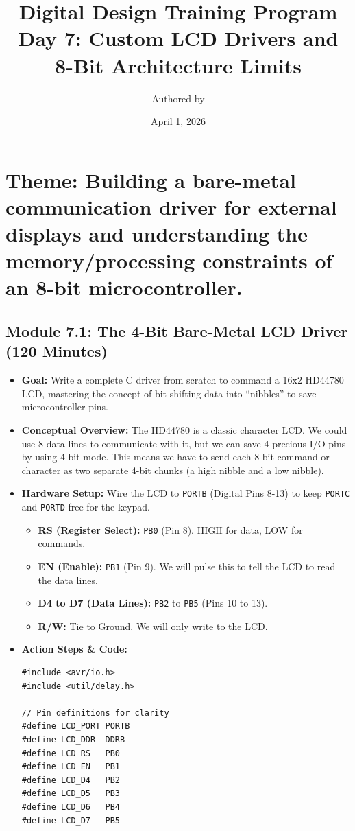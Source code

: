 \documentclass[11pt,a4paper]{article}
\title{Digital Design Training Program \\ \large Day 7: Custom LCD Drivers and 8-Bit Architecture Limits}
\author{Authored by }
\date{April 1, 2026}
\begin{document}
\maketitle

\section*{Theme: Building a bare-metal communication driver for external displays and understanding the memory/processing constraints of an 8-bit microcontroller.}

\subsection*{Module 7.1: The 4-Bit Bare-Metal LCD Driver (120 Minutes)}

\begin{itemize}
    \item \textbf{Goal:} Write a complete C driver from scratch to command a 16x2 HD44780 LCD, mastering the concept of bit-shifting data into ``nibbles'' to save microcontroller pins.
    \item \textbf{Conceptual Overview:} The HD44780 is a classic character LCD. We could use 8 data lines to communicate with it, but we can save 4 precious I/O pins by using 4-bit mode. This means we have to send each 8-bit command or character as two separate 4-bit chunks (a high nibble and a low nibble).
    \item \textbf{Hardware Setup:} Wire the LCD to \verb|PORTB| (Digital Pins 8-13) to keep \verb|PORTC| and \verb|PORTD| free for the keypad.
    \begin{itemize}
        \item \textbf{RS (Register Select):} \verb|PB0| (Pin 8). HIGH for data, LOW for commands.
        \item \textbf{EN (Enable):} \verb|PB1| (Pin 9). We will pulse this to tell the LCD to read the data lines.
        \item \textbf{D4 to D7 (Data Lines):} \verb|PB2| to \verb|PB5| (Pins 10 to 13).
        \item \textbf{R/W:} Tie to Ground. We will only write to the LCD.
    \end{itemize}
    \item \textbf{Action Steps \& Code:}
\begin{lstlisting}[caption={Code for Module 7.1: Bare-Metal LCD Driver}]
#include <avr/io.h>
#include <util/delay.h>

// Pin definitions for clarity
#define LCD_PORT PORTB
#define LCD_DDR  DDRB
#define LCD_RS   PB0
#define LCD_EN   PB1
#define LCD_D4   PB2
#define LCD_D5   PB3
#define LCD_D6   PB4
#define LCD_D7   PB5


\end{lstlisting}
\end{itemize}
\end{document}
